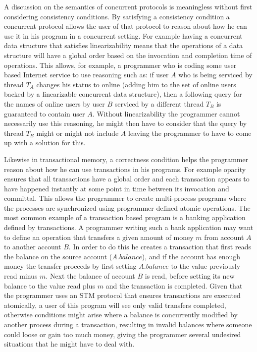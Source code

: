 A discussion on the semantics of concurrent protocols is meaningless without
first considering consistency conditions.
By satisfying a consistency condition a concurrent protocol allows the
user of that protocol to reason about how he can use it in his program
in a concurrent setting.
For example having a concurrent data structure that satisfies linearizability
means that the operations of a data structure will have a global order
based on the invocation and completion time of operations.
This allows, for example, a programmer who is coding some user based Internet service
to use reasoning such as: if user $A$ who
is being serviced by thread $T_A$ changes his status to online (adding him
to the set of online users backed by a linearizable concurrent data structure),
then a following query for the names of online users
by user $B$ serviced by a different thread $T_B$ is guaranteed to contain
user $A$.
Without linearizability the programmer cannot necessarily use this reasoning, he might then
have to consider that the query by thread $T_B$ might or might not include $A$
leaving the programmer to have to come up with a solution for this.

Likewise in transactional memory, a correctness condition helps the
programmer reason about how he can use transactions in his programs.
For example opacity ensures that all transactions have a global order
and each transaction appears to have happened instantly at some point
in time between its invocation and committal.
This allows the programmer to create multi-process programs where the processes are
synchronized using programmer defined atomic operations.
The most common example of a transaction based program is a banking application defined by transactions.
A programmer writing such a bank application may want to define an operation
that transfers a given amount of money $m$ from account $A$ to another account $B$.
In order to do this he creates a transaction that first reads the balance
on the source account ($A.balance$), and if the account has enough money the transfer
proceeds by first setting $A.balance$ to the value previously read minus $m$.
Next the balance of account $B$ is read, before setting its new balance
to the value read plus $m$ and the transaction is completed.
Given that the programmer uses an STM protocol that ensures transactions are executed
atomically, a user of this program will see only valid transfers
completed, otherwise conditions might arise where a balance is concurrently
modified by another process during a transaction, resulting in invalid balances
where someone could loose or gain too much money, giving the programmer
several undesired situations that he might have to deal with.

